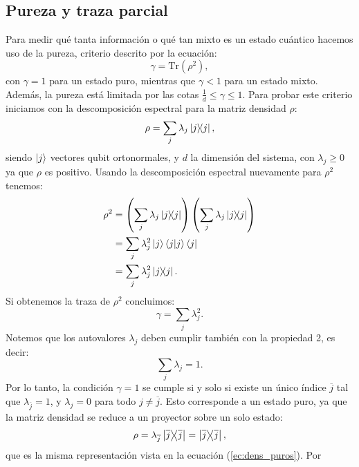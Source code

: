 \documentclass[letterpaper,12pt]{thesisECFM}
\theoremstyle{plain}
\theoremstyle{definition}
\theoremstyle{definition}
\theoremstyle{remark}
\newcommand{\1}{\mathbb{1}}
\begin{document}
\subsection{Pureza y traza parcial} %
Para medir qué tanta información o qué tan mixto es un estado cuántico hacemos uso de la pureza, criterio descrito por la ecuación:
\begin{equation}
    \label{ec::1.25}
    \gamma = \text{Tr}(\rho ^2),
\end{equation}
con $\gamma=1$ para un estado puro, mientras que $\gamma < 1$ para un estado
mixto. Además, la pureza está limitada por las cotas $ \frac{1}{d}\leq\gamma\leq 1$.  Para probar este criterio iniciamos con la descomposición espectral
\cite{princip_quantum} para la matriz densidad $\rho$:
    \begin{equation} 
        \label{ec:dens_espectral}
        \rho = \sum_{j} \lambda_j \ketbra{j},
    \end{equation}
siendo $\ket{j}$ vectores qubit ortonormales, y $d$ la dimensión del sistema, con  $\lambda_j \geq0$ ya que $\rho$ es positivo. 
 Usando la descomposición espectral nuevamente para $\rho^2$ tenemos:
    \begin{align}
        \rho^2 & = \left(\sum_{j} \lambda_j \ketbra{j} \right) \left(\sum_{j} \lambda_j \ketbra{j} \right) \\
        &= \sum_{j} \lambda^2_j \ket{j}\braket{j}\bra{j} \\
        & = \sum_{j} \lambda_j^2\ketbra{j}.
    \end{align}
Si obtenemos la traza de $\rho^2$ concluimos: 
    \begin{equation}
    \label{eq:pureza_lambdas}
    \gamma=\sum_j\lambda_j^2.
    \end{equation} 
Notemos que los autovalores $\lambda_j$ deben cumplir también con la propiedad 2, es decir:
    \begin{equation}
    \label{ec:dens_eigvals}
    \sum_j \lambda_j = 1.
    \end{equation} 
Por lo tanto, la condición $\gamma = 1$ se cumple si y solo si existe un único
índice $\overline{j}$ tal que $\lambda_{\overline{j}} = 1$, y $\lambda_j = 0$
para todo $j \ne \overline{j}$.  Esto corresponde a un estado puro, ya que la matriz densidad se
reduce a un proyector sobre un solo estado:
\begin{equation}
\rho  = \lambda_{\overline{j}} \ketbra{\overline{j}} = \ketbra{\overline{j}},
\end{equation}
que es la misma representación vista en la ecuación (\ref{ec:dens_puros}). Por
\end{document}
